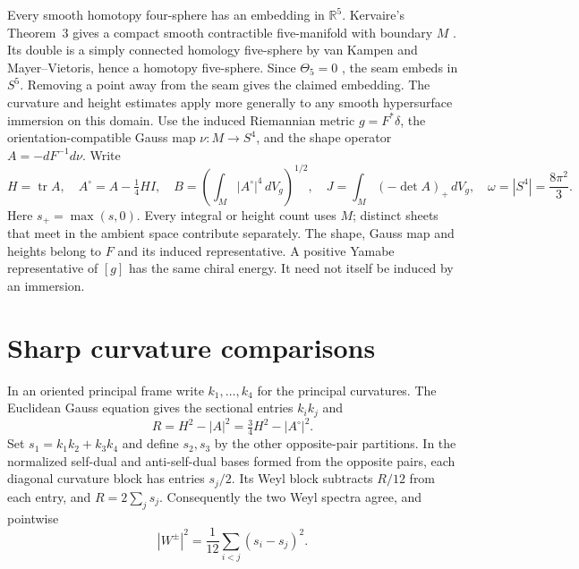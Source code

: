\documentclass[11pt,letterpaper]{article}
\numberwithin{equation}{section}
\newcommand{\R}{\mathbb R}
\begin{document}
Every smooth homotopy four-sphere has an embedding in \(\R^5\).
Kervaire's Theorem~3 gives a compact smooth contractible five-manifold
with boundary \(M\) \cite{Kervaire1969HomologySpheres}. Its double is
a simply connected homology five-sphere by van Kampen and
Mayer--Vietoris, hence a homotopy five-sphere. Since \(\Theta_5=0\)
\cite{KervaireMilnor1963Groups}, the seam embeds in \(S^5\).
Removing a point away from the seam gives the claimed embedding.
The curvature and height estimates apply more generally to any
smooth hypersurface immersion on this domain.
Use the induced Riemannian metric \(g=F^*\delta\), the
orientation-compatible Gauss map \(\nu:M\to S^4\), and the
shape operator \(A=-dF^{-1}d\nu\). Write
\[
 H=\operatorname{tr}A,\quad A^\circ=A-\tfrac14 H I,\quad
 B=\left(\int_M |A^\circ|^4\,dV_g\right)^{1/2},\quad
 J=\int_M(-\det A)_+\,dV_g,\quad \omega=|S^4|=\frac{8\pi^2}{3}.
\]
Here \(s_+=\max(s,0)\). Every integral or height count uses \(M\);
distinct sheets that meet in the ambient space contribute separately.
The shape, Gauss map and heights belong to \(F\) and its induced
representative. A positive Yamabe representative of \([g]\) has the
same chiral energy. It need not itself be induced by an immersion.

\section{Sharp curvature comparisons}

In an oriented principal frame write \(k_1,\ldots,k_4\) for the
principal curvatures. The Euclidean Gauss equation gives the
sectional entries \(k_i k_j\) and
\begin{equation}\label{eq:scalar}
 R=H^2-|A|^2=\tfrac34 H^2-|A^\circ|^2.
\end{equation}
Set \(s_1=k_1k_2+k_3k_4\) and define \(s_2,s_3\) by the other
opposite-pair partitions. In the normalized self-dual and
anti-self-dual bases formed from the opposite pairs, each
diagonal curvature block has entries \(s_j/2\). Its Weyl block
subtracts \(R/12\) from each entry, and \(R=2\sum_j s_j\).
Consequently the two Weyl spectra agree, and pointwise
\begin{equation}\label{eq:weylsums}
 |W^\pm|^2=\frac1{12}\sum_{i<j}(s_i-s_j)^2 .
\end{equation}
\end{document}
